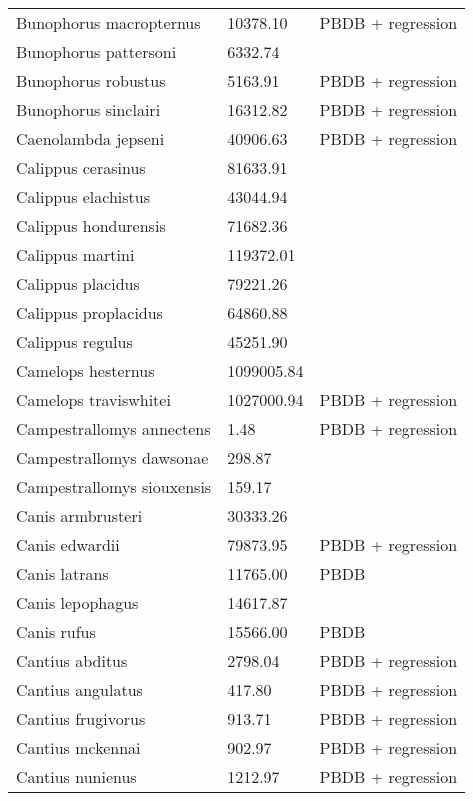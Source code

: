 \documentclass{article}
\begin{document}
\begin{center}
\begin{longtable}{p{} p{} p{}}
    Bunophorus macropternus & 10378.10 & PBDB + regression \\ 
    Bunophorus pattersoni & 6332.74 & \cite{Macdonald1956} \\ 
    Bunophorus robustus & 5163.91 & PBDB + regression \\ 
    Bunophorus sinclairi & 16312.82 & PBDB + regression \\ 
    Caenolambda jepseni & 40906.63 & PBDB + regression \\ 
    Calippus cerasinus & 81633.91 & \cite{Tomiya2013} \\ 
    Calippus elachistus & 43044.94 & \cite{Tomiya2013} \\ 
    Calippus hondurensis & 71682.36 & \cite{Tomiya2013} \\ 
    Calippus martini & 119372.01 & \cite{Tomiya2013} \\ 
    Calippus placidus & 79221.26 & \cite{Tomiya2013} \\ 
    Calippus proplacidus & 64860.88 & \cite{Tomiya2013} \\ 
    Calippus regulus & 45251.90 & \cite{Tomiya2013} \\ 
    Camelops hesternus & 1099005.84 & \cite{Smith2004} \\ 
    Camelops traviswhitei & 1027000.94 & PBDB + regression \\ 
    Campestrallomys annectens & 1.48 & PBDB + regression \\ 
    Campestrallomys dawsonae & 298.87 & \cite{Tomiya2013} \\ 
    Campestrallomys siouxensis & 159.17 & \cite{Tomiya2013} \\ 
    Canis armbrusteri & 30333.26 & \cite{Tomiya2013} \\ 
    Canis edwardii & 79873.95 & PBDB + regression \\ 
    Canis latrans & 11765.00 & PBDB \\ 
    Canis lepophagus & 14617.87 & \cite{Tomiya2013} \\ 
    Canis rufus & 15566.00 & PBDB \\ 
    Cantius abditus & 2798.04 & PBDB + regression \\ 
    Cantius angulatus & 417.80 & PBDB + regression \\ 
    Cantius frugivorus & 913.71 & PBDB + regression \\ 
    Cantius mckennai & 902.97 & PBDB + regression \\ 
    Cantius nunienus & 1212.97 & PBDB + regression \\ 

\end{longtable}
\end{center}
\end{document}
